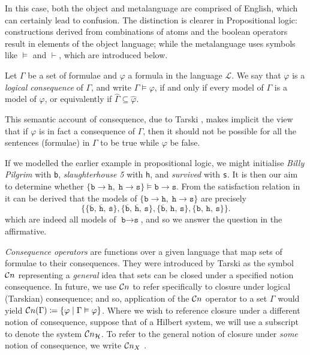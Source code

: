 In this case, both the object and metalanguage are comprised of English, which can certainly lead to confusion. The distinction is clearer in Propositional logic: constructions derived from combinations of atoms and the boolean operators result in elements of the object language; while the metalanguage uses symbols like $\vDash$ and $\vdash$, which are introduced below. 

\begin{definition}
     \label{definition:logical-consequence}
     Let $\Gamma$ be a set of formulae and $\varphi$ a formula in the language $\mathcal{L}$. We say that $\varphi$ is a \textit{logical consequence} of $\Gamma$, and write $\Gamma \vDash \varphi$, if and only if every model of $\Gamma$ is a model of $\varphi$, or equivalently if $\hat{\Gamma} \subseteq \hat{\varphi}$.
\end{definition}

This semantic account of consequence, due to Tarski \cite[p. 417]{tarski1936consequence}, makes implicit the view that if $\varphi$ is in fact a consequence of $\Gamma$, then it should not be possible for all the sentences (formulae) in $\Gamma$ to be true while $\varphi$ be false. 

\begin{example}
     \label{example-logical-consequence}   
     If we modelled the earlier example in propositional logic, we might initialise \textit{Billy Pilgrim} with \texttt{b}, \textit{slaughterhouse 5} with \texttt{h}, and \textit{survived} with \texttt{s}. It is then our aim to determine whether $\{\texttt{b} \rightarrow \texttt{h},\; \texttt{h} \rightarrow \texttt{s}\} \vDash \texttt{b} \rightarrow \texttt{s}$. From the satisfaction relation in  it can be derived that the models of $\{\texttt{b} \rightarrow \texttt{h},\; \texttt{h} \rightarrow \texttt{s}\}$ are precisely
\[
     \bigl\{
       \{\overline{\texttt{b}},\,\overline{\texttt{h}},\,\overline{\texttt{s}}\},
       \{\overline{\texttt{b}},\,\overline{\texttt{h}},\,{\texttt{s}}\},
       \{\overline{\texttt{b}},\,{\texttt{h}},\,{\texttt{s}}\},
       \{{\texttt{b}},\,{\texttt{h}},\,{\texttt{s}}\}
     \bigr\}.
\]
which are indeed all models of $\texttt{b} \rightarrow \texttt{s}$, and so we answer the question in the affirmative. 
\end{example}

\textit{Consequence operators} are functions over a given language that map sets of formulae to their consequences. They were introduced by Tarski \cite[p. 84]{tarski1936operator} as the symbol $\mathcal{C}n$ representing a \textit{general} idea that sets can be closed under a specified notion consequence. In future, we use $\mathcal{C}n$ to refer specifically to closure under logical (Tarskian) consequence; and so, application of the $\mathcal{C}n$ operator to a set $\Gamma$ would yield $\mathcal{C}n (\Gamma) \coloneqq \{\varphi \mid \Gamma \vDash \varphi\}$. Where we wish to reference closure under a different notion of consequence, suppose that of a Hilbert system, we will use a subscript to denote the system $\mathcal{C}n_\mathcal{H}$. To refer to the general notion of closure under \textit{some} notion of consequence, we write $\mathcal{C}n_X$ \cite[p. 4]{citkin2022consequence}.

